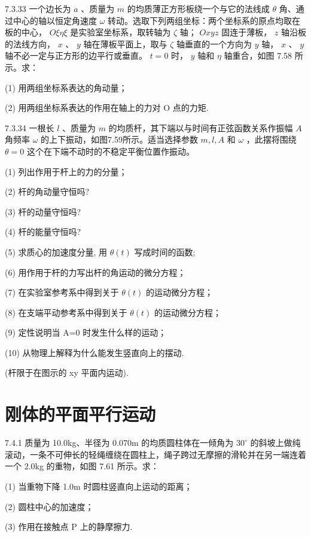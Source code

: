 \begin{problem}{7.3.33}
一个边长为 $a$ 、质量为 $m$ 的均质薄正方形板绕一个与它的法线成 $\theta$ 角、通过中心的轴以恒定角速度 $\omega$ 转动。选取下列两组坐标：两个坐标系的原点均取在板的中心， $O\xi\eta\xi$ 是实验室坐标系，取转轴为 $\zeta$ 轴； $Oxyz$ 固连于薄板， $z$ 轴沿板的法线方向， $x$ 、 $y$ 轴在薄板平面上，取与 $\zeta$ 轴垂直的一个方向为 $y$ 轴， $x$ 、 $y$ 轴不必一定与正方形的边平行或垂直。 $t=0$ 时， $y$ 轴和 $\eta$ 轴重合，如图 7.58 所示。求：

(1) 用两组坐标系表达的角动量；

(2) 用两组坐标系表达的作用在轴上的力对 O 点的力矩.
\begin{center}

\end{center}
\end{problem}
\clearpage


\begin{problem}{7.3.34}
一根长 $l$ 、质量为 $m$ 的均质杆，其下端以与时间有正弦函数关系作振幅 $A$ 角频率 $\omega$ 的上下振动，如图7.59所示。适当选择参数 $m, l, A$ 和 $\omega$ ，此摆将围绕 $\theta = 0$ 这个在下端不动时的不稳定平衡位置作振动。

(1) 列出作用于杆上的力的分量；

(2) 杆的角动量守恒吗?

(3) 杆的动量守恒吗?

(4) 杆的能量守恒吗?

(5) 求质心的加速度分量, 用 $\theta(t)$ 写成时间的函数;

(6) 用作用于杆的力写出杆的角运动的微分方程；

(7) 在实验室参考系中得到关于 $\theta(t)$ 的运动微分方程；

(8) 在支端平动参考系中得到关于 $\theta(t)$ 的运动微分方程；

(9) 定性说明当 A=0 时发生什么样的运动；

(10) 从物理上解释为什么能发生竖直向上的摆动.

(杆限于在图示的 xy 平面内运动).
\begin{center}

\end{center}
\end{problem}
\clearpage


\section{刚体的平面平行运动}

\begin{problem}{7.4.1}
质量为 10.0kg、半径为 0.070m 的均质圆柱体在一倾角为 $30^{\circ}$ 的斜坡上做纯滚动，一条不可伸长的轻绳缠绕在圆柱上，绳子跨过无摩擦的滑轮并在另一端连着一个 2.0kg 的重物，如图 7.61 所示。求：

(1) 当重物下降 1.0m 时圆柱竖直向上运动的距离；

(2) 圆柱中心的加速度；

(3) 作用在接触点 P 上的静摩擦力.
\begin{center}

\end{center}
\end{problem}
\clearpage


